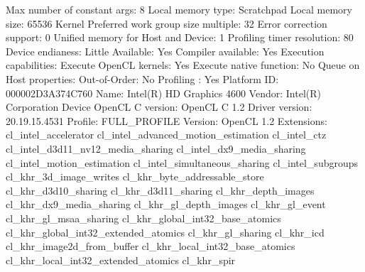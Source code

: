 \begin{codebox}[text]
  Max number of constant args:                   8
  Local memory type:                             Scratchpad
  Local memory size:                             65536
  Kernel Preferred work group size multiple:     32
  Error correction support:                      0
  Unified memory for Host and Device:            1
  Profiling timer resolution:                    80
  Device endianess:                              Little
  Available:                                     Yes
  Compiler available:                            Yes
  Execution capabilities:
    Execute OpenCL kernels:                      Yes
    Execute native function:                     No
  Queue on Host properties:
    Out-of-Order:                                No
    Profiling :                                  Yes
  Platform ID:                                   000002D3A374C760
  Name:                                          Intel(R) HD Graphics 4600
  Vendor:                                        Intel(R) Corporation
  Device OpenCL C version:                       OpenCL C 1.2
  Driver version:                                20.19.15.4531
  Profile:                                       FULL_PROFILE
  Version:                                       OpenCL 1.2
  Extensions:
   cl_intel_accelerator
   cl_intel_advanced_motion_estimation
   cl_intel_ctz
   cl_intel_d3d11_nv12_media_sharing
   cl_intel_dx9_media_sharing
   cl_intel_motion_estimation
   cl_intel_simultaneous_sharing
   cl_intel_subgroups
   cl_khr_3d_image_writes
   cl_khr_byte_addressable_store
   cl_khr_d3d10_sharing
   cl_khr_d3d11_sharing
   cl_khr_depth_images
   cl_khr_dx9_media_sharing
   cl_khr_gl_depth_images
   cl_khr_gl_event
   cl_khr_gl_msaa_sharing
   cl_khr_global_int32_base_atomics
   cl_khr_global_int32_extended_atomics
   cl_khr_gl_sharing
   cl_khr_icd
   cl_khr_image2d_from_buffer
   cl_khr_local_int32_base_atomics
   cl_khr_local_int32_extended_atomics
   cl_khr_spir


\end{codebox}
